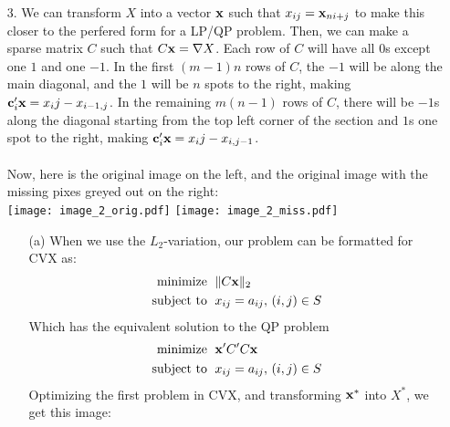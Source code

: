 \documentclass[11pt]{article}
\theoremstyle{definition}
\begin{document}
\begin{itemize}
    \item[3.]
        We can transform $X$ into a vector ${\bf x}$ such that \(x_{ij}={\bf x}_{ni+j}\) to make this closer to the perfered form for a LP/QP problem. Then, we can make a sparse matrix $C$ such that $C{\bf x}=\nabla X$. Each row of $C$ will have all $0$s except one $1$ and one $-1$. In the first $(m-1)n$ rows of $C$, the $-1$ will be along the main diagonal, and the $1$ will be $n$ spots to the right, making ${\bf c}_i'{\bf x}=x_ij-x_{i-1,j}$. In the remaining $m(n-1)$ rows of $C$, there will be $-1$s along the diagonal starting from the top left corner of the section and $1$s one spot to the right, making ${\bf c}_i'{\bf x}=x_ij-x_{i,j-1}$. \\
        \smallskip \\
        Now, here is the original image on the left, and the original image with the missing pixes greyed out on the right: \\
        \texttt{[image: image\_2\_orig.pdf]}
        \texttt{[image: image\_2\_miss.pdf]}

        \begin{itemize}
            \item[(a)]
                When we use the $L_2$-variation, our problem can be formatted for CVX as: 
                \begin{align*}
                    \text{minimize    }\; & \|C{\bf x}\|_2 \\
                    \text{subject to  }\; & x_{ij}=a_{ij},\, (i,j)\in S  \\
                \end{align*}
                Which has the equivalent solution to the QP problem  
                \begin{align*}
                    \text{minimize    }\; & {\bf x}'C'C{\bf x} \\
                    \text{subject to  }\; & x_{ij}=a_{ij},\, (i,j)\in S  \\
                \end{align*}
                Optimizing the first problem in CVX, and transforming ${\bf x}^*$ into $X^*$, we get this image:


\end{itemize}
\end{itemize}
\end{document}
